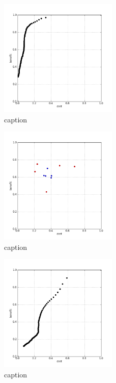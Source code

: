%
\begin{figure}[!ht]
	\centering
	\includegraphics[width=0.5\textwidth]{img/p1figs/computeFrameStateAnders_sectionCompareBetter_smooth12_tol48_AUC.png}
	\caption{caption}
\end{figure}
%
\begin{figure}[!ht]
	\centering
	\includegraphics[width=0.5\textwidth]{img/p1figs/computeFrameStateAnders_simpleCompare_smooth0_tol0.png}
	\caption{caption}
\end{figure}
%
\begin{figure}[!ht]
	\centering
	\includegraphics[width=0.5\textwidth]{img/p1figs/computeFrameStateAnders_simpleCompare_smooth0_tol0_AUC.png}
	\caption{caption}
\end{figure}
